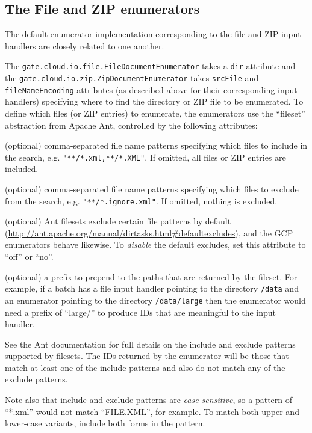 \subsection{The File and ZIP enumerators}

The default enumerator implementation corresponding to the file and ZIP input
handlers are closely related to one another.

The \verb!gate.cloud.io.file.FileDocumentEnumerator! takes a \verb!dir!
attribute and the \verb!gate.cloud.io.zip.ZipDocumentEnumerator! takes
\verb!srcFile! and \verb!fileNameEncoding! attributes (as described above for
their corresponding input handlers) specifying where to find the directory
or ZIP file to be enumerated.  To define which files (or ZIP entries) to
enumerate, the enumerators use the ``fileset'' abstraction from Apache Ant,
controlled by the following attributes:

\bde
\item[includes] (optional) comma-separated file name patterns specifying which
  files to include in the search, e.g. \verb!"**/*.xml,**/*.XML"!.  If
  omitted, all files or ZIP entries are included.
\item[excludes] (optional) comma-separated file name patterns specifying which
  files to exclude from the search, e.g. \verb!"**/*.ignore.xml"!.  If omitted,
  nothing is excluded.
\item[defaultExcludes] (optional) Ant filesets exclude certain file patterns by
  default (\url{http://ant.apache.org/manual/dirtasks.html#defaultexcludes}),
  and the GCP enumerators behave likewise.  To {\em disable} the default
  excludes, set this attribute to ``off'' or ``no''.
\item[prefix] (optional) a prefix to prepend to the paths that are returned by
  the fileset.  For example, if a batch has a file input handler pointing to
  the directory \verb!/data! and an enumerator pointing to the directory
  \verb!/data/large! then the enumerator would need a prefix of ``large/'' to
  produce IDs that are meaningful to the input handler.
\ede

See the Ant documentation for full details on the include and exclude patterns
supported by filesets.  The IDs returned by the enumerator will be those that
match at least one of the include patterns and also do not match any of the
exclude patterns.

Note also that include and exclude patterns are {\em case sensitive}, so a
pattern of ``*.xml'' would not match ``FILE.XML'', for example.  To match both
upper and lower-case variants, include both forms in the pattern.

